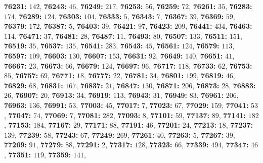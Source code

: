 \textsf{\bfseries 76231:} $142$, \textsf{\bfseries 76243:} $46$, \textsf{\bfseries 76249:} $217$, \textsf{\bfseries 76253:} $56$, \textsf{\bfseries 76259:} $72$, \textsf{\bfseries 76261:} $35$, \textsf{\bfseries 76283:} $174$, \textsf{\bfseries 76289:} $124$, \textsf{\bfseries 76303:} $104$, \textsf{\bfseries 76333:} $5$, \textsf{\bfseries 76343:} $7$, \textsf{\bfseries 76367:} $39$, \textsf{\bfseries 76369:} $59$, \textsf{\bfseries 76379:} $172$, \textsf{\bfseries 76387:} $5$, \textsf{\bfseries 76403:} $39$, \textsf{\bfseries 76421:} $97$, \textsf{\bfseries 76423:} $209$, \textsf{\bfseries 76441:} $434$, \textsf{\bfseries 76463:} $114$, \textsf{\bfseries 76471:} $37$, \textsf{\bfseries 76481:} $28$, \textsf{\bfseries 76487:} $11$, \textsf{\bfseries 76493:} $80$, \textsf{\bfseries 76507:} $133$, \textsf{\bfseries 76511:} $151$, \textsf{\bfseries 76519:} $35$, \textsf{\bfseries 76537:} $135$, \textsf{\bfseries 76541:} $283$, \textsf{\bfseries 76543:} $45$, \textsf{\bfseries 76561:} $124$, \textsf{\bfseries 76579:} $113$, \textsf{\bfseries 76597:} $109$, \textsf{\bfseries 76603:} $130$, \textsf{\bfseries 76607:} $153$, \textsf{\bfseries 76631:} $92$, \textsf{\bfseries 76649:} $140$, \textsf{\bfseries 76651:} $41$, \textsf{\bfseries 76667:} $23$, \textsf{\bfseries 76673:} $66$, \textsf{\bfseries 76679:} $124$, \textsf{\bfseries 76697:} $96$, \textsf{\bfseries 76717:} $118$, \textsf{\bfseries 76733:} $62$, \textsf{\bfseries 76753:} $85$, \textsf{\bfseries 76757:} $69$, \textsf{\bfseries 76771:} $18$, \textsf{\bfseries 76777:} $22$, \textsf{\bfseries 76781:} $34$, \textsf{\bfseries 76801:} $199$, \textsf{\bfseries 76819:} $46$, \textsf{\bfseries 76829:} $68$, \textsf{\bfseries 76831:} $167$, \textsf{\bfseries 76837:} $21$, \textsf{\bfseries 76847:} $130$, \textsf{\bfseries 76871:} $206$, \textsf{\bfseries 76873:} $28$, \textsf{\bfseries 76883:} $26$, \textsf{\bfseries 76907:} $20$, \textsf{\bfseries 76913:} $34$, \textsf{\bfseries 76919:} $113$, \textsf{\bfseries 76943:} $31$, \textsf{\bfseries 76949:} $83$, \textsf{\bfseries 76961:} $206$, \textsf{\bfseries 76963:} $136$, \textsf{\bfseries 76991:} $53$, \textsf{\bfseries 77003:} $45$, \textsf{\bfseries 77017:} $7$, \textsf{\bfseries 77023:} $67$, \textsf{\bfseries 77029:} $159$, \textsf{\bfseries 77041:} $53$, \textsf{\bfseries 77047:} $74$, \textsf{\bfseries 77069:} $7$, \textsf{\bfseries 77081:} $282$, \textsf{\bfseries 77093:} $8$, \textsf{\bfseries 77101:} $59$, \textsf{\bfseries 77137:} $89$, \textsf{\bfseries 77141:} $182$, \textsf{\bfseries 77153:} $184$, \textsf{\bfseries 77167:} $29$, \textsf{\bfseries 77171:} $88$, \textsf{\bfseries 77191:} $46$, \textsf{\bfseries 77201:} $24$, \textsf{\bfseries 77213:} $18$, \textsf{\bfseries 77237:} $139$, \textsf{\bfseries 77239:} $58$, \textsf{\bfseries 77243:} $67$, \textsf{\bfseries 77249:} $269$, \textsf{\bfseries 77261:} $40$, \textsf{\bfseries 77263:} $5$, \textsf{\bfseries 77267:} $39$, \textsf{\bfseries 77269:} $91$, \textsf{\bfseries 77279:} $88$, \textsf{\bfseries 77291:} $2$, \textsf{\bfseries 77317:} $128$, \textsf{\bfseries 77323:} $66$, \textsf{\bfseries 77339:} $494$, \textsf{\bfseries 77347:} $46$, \textsf{\bfseries 77351:} $119$, \textsf{\bfseries 77359:} $141$, 
